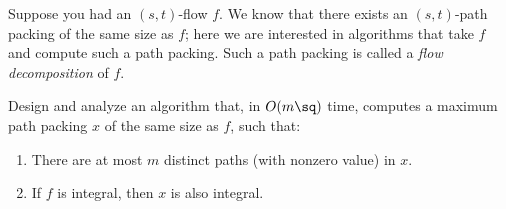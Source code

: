\documentclass{article}
\begin{document}
\setcounter{section}{18}
\setcounter{exercise}{2}
\begin{exercise} \label{ex:flow-decomp}
  Suppose you had an \( (s, t) \)-flow \( f \).
  We know that there exists an \( (s,t) \)-path packing of the same size as \( f \); here we are interested in algorithms that take \( f \) and compute such a path packing.
  Such a path packing is called a \textit{flow decomposition} of \( f \).

  Design and analyze an algorithm that, in \( O(m\sq) \) time, computes a maximum path packing \( x \) of the same size as \( f \), such that:
  \begin{enumerate}
    \item There are at most \( m \) distinct paths (with nonzero value) in \( x \).
    \item If \( f \) is integral, then \( x \) is also integral.
  \end{enumerate}
\end{exercise}
\end{document}
